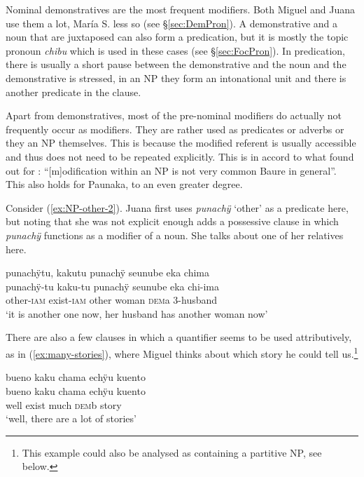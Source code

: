 {Nominal demonstratives are the most frequent modifiers. Both Miguel and Juana use them a lot, María S. less so (see §\ref{sec:DemPron}). A demonstrative and a noun that are juxtaposed can also form a predication, but it is mostly the topic pronoun \textit{chibu} which is used in these cases (see §\ref{sec:FocPron}). In predication, there is usually a short pause between the demonstrative and the noun and the demonstrative is stressed, in an NP they form an intonational unit and there is another predicate in the clause.

Apart from demonstratives, most of the pre-nominal modifiers do actually not frequently occur as modifiers. They are rather used as predicates or adverbs or they  an NP themselves. This is because the modified referent is usually accessible and thus does not need to be repeated explicitly. This is in accord to what \citet[168]{Danielsen2007} found out for : “[m]odification within an NP is not very common Baure in general”. This also holds for Paunaka, to an even greater degree. 

Consider (\ref{ex:NP-other-2}). Juana first uses \textit{punachÿ} ‘other’ as a predicate here, but noting that she was not explicit enough adds a possessive clause in which \textit{punachÿ} functions as a modifier of a noun. She talks about one of her relatives here.

\ea\label{ex:NP-other-2}
\begingl
\glpreamble punachÿtu, kakutu punachÿ seunube eka chima\\
\gla punachÿ-tu kaku-tu punachÿ seunube eka chi-ima\\
\glb other-\textsc{iam} exist-\textsc{iam} other woman \textsc{dem}a 3-husband\\
\glft ‘it is another one now, her husband has another woman now’
\endgl
\trailingcitation{[jxx-p120430l-1.402]}
\xe

There are also a few clauses in which a quantifier seems to be used attributively, as in (\ref{ex:many-stories}), where Miguel thinks about which story he could tell us.\footnote{This example could also be analysed as containing a partitive NP, see below.}

\ea\label{ex:many-stories}
\begingl
\glpreamble bueno kaku chama echÿu kuento\\
\gla bueno kaku chama echÿu kuento\\
\glb well exist much \textsc{dem}b story\\
\glft ‘well, there are a lot of stories’
\endgl
\trailingcitation{[jmx-n120429ls-x5.048]}
\xe

}
